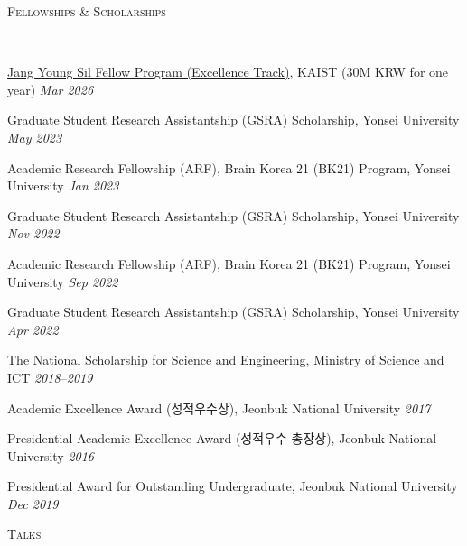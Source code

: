 \documentclass[10pt]{article}
\newenvironment{changemargin}[2]{
  \begin{list}{}{
    \setlength{\topsep}{0pt}
    \setlength{\leftmargin}{#1}
    \setlength{\rightmargin}{#2}
    \setlength{\listparindent}{\parindent}
    \setlength{\itemindent}{\parindent}
    \setlength{\parsep}{\parskip}
  }
  \item[]}{\end{list}
}
\newcommand{\lineover}{
	\begin{changemargin}{-0.05in}{-0.05in}
		\vspace*{-8pt}
		\hrulefill \\
		\vspace*{-2pt}
	\end{changemargin}
}
\newcommand{\header}[1]{
	\begin{changemargin}{-0.5in}{-0.5in}
		\scshape{#1}\\
  	\lineover
	\end{changemargin}
}
\newcommand{\award}[2]{
	{#1} \hfill \emph{#2}\\ \medskip
}
\newenvironment{body} {
	\vspace*{-16pt}
	\begin{changemargin}{-0.25in}{-0.5in}
  }
	{\end{changemargin}
}
\begin{document}
\header{Fellowships \& Scholarships}
\begin{body}
	\vspace{14pt}
\award{\href{https://research.kaist.ac.kr}{Jang Young Sil Fellow Program (Excellence Track)}, KAIST (30M KRW for one year)}{Mar 2026}
\award{Graduate Student Research Assistantship (GSRA) Scholarship, Yonsei University}{May 2023}
\award{Academic Research Fellowship (ARF), Brain Korea 21 (BK21) Program, Yonsei University}{Jan 2023}
\award{Graduate Student Research Assistantship (GSRA) Scholarship, Yonsei University}{Nov 2022}
\award{Academic Research Fellowship (ARF), Brain Korea 21 (BK21) Program, Yonsei University}{Sep 2022}
\award{Graduate Student Research Assistantship (GSRA) Scholarship, Yonsei University}{Apr 2022}
\award{\href{https://www.jeongwhanchoi.com/assets/award/national_scholar.pdf}{The National Scholarship for Science and Engineering}, Ministry of Science and ICT}{2018--2019}
\award{Academic Excellence Award (성적우수상), Jeonbuk National University}{2017}
\award{Presidential Academic Excellence Award (성적우수 총장상), Jeonbuk National University}{2016}
\award{Presidential Award for Outstanding Undergraduate, Jeonbuk National University}{Dec 2019}
\end{body}

\medskip
\header{Talks}
\end{document}
